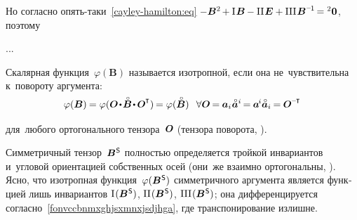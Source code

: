 \begin{otherlanguage}{russian}

Но согласно опять\hbox{-}таки~\eqref{cayley-hamilton:eq}
${\hspace{-0.1ex} -\bm{B}^{2} \hspace{-0.2ex} + \mathrm{I}\hspace{.16ex} \bm{B} \hspace{-0.1ex} - \mathrm{II}\hspace{.16ex} \UnitDyad + \mathrm{III}\hspace{.16ex} \bm{B}^{\expminusone} \hspace{-0.25ex} = {^2\bm{0}}}$, поэтому


...


Скалярная функция~${\varphi(\bm{B})}$ называется изотропной, если она не~чувствительна к~повороту аргумента:
\nopagebreak\vspace{.1em}\begin{equation*}
\varphi(\bm{B}) \hspace{-0.12ex} = \varphi ( \rotationtensor \narrowdotp \smash{\mathcircabove{\bm{B}}} \narrowdotp \hspace{.15ex} \rotationtensor^{\hspace{-0.1ex}\T} ) \hspace{-0.2ex} = \varphi(\smash{\mathcircabove{\bm{B}}}) \;\;\,
\forall \rotationtensor \hspace{-0.2ex} = \hspace{-0.1ex} \bm{a}_i \hspace{.1ex} \mathcircabove{\bm{a}}^i \hspace{-0.25ex} = \hspace{-0.1ex} \bm{a}^{\hspace{-0.2ex}i} \mathcircabove{\bm{a}}_i \hspace{-0.16ex} = \hspace{-0.1ex} \rotationtensor^{\hspace{-0.1ex}\expminusT}
\end{equation*}
\par\vspace{-0.25em}\noindent для~любого ортогонального тензора~$\bm{O}$ (тензора поворота, ).

Симметричный тензор~${\bm{B}^{\mathsf{\hspace{.1ex}S}}}$ полностью определяется тройкой инвариантов и~угловой ориентацией собственных осей (они~же взаимно ортогональны, ).
Ясно, что изотропная функция~${\varphi(\bm{B}^{\mathsf{\hspace{.1ex}S}})}$ симметричного аргумента является функцией лишь инвариантов ${\mathrm{I}\hspace{.16ex}({\bm{B}^{\mathsf{\hspace{.1ex}S}}})}$, ${\mathrm{II}\hspace{.16ex}({\bm{B}^{\mathsf{\hspace{.1ex}S}}})}$, ${\mathrm{III}\hspace{.16ex}({\bm{B}^{\mathsf{\hspace{.1ex}S}}})}$;
она дифференцируется согласно~\eqref{fonvccbnmxghjsxmnxjsdjhga}, где транспонирование излишне.


\end{otherlanguage}
